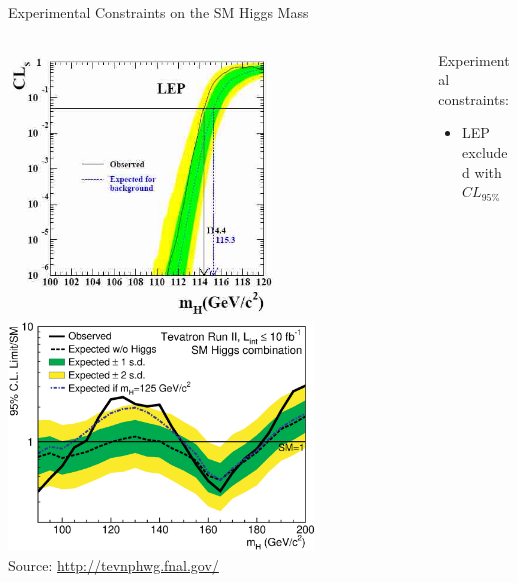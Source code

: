 \begin{frame}{Experimental Constraints on the SM Higgs Mass}
\begin{center}
\begin{columns}
      \begin{column}{0.5\textwidth}
        \begin{center}
\includegraphics[width=0.65\textwidth]{images/lep2limit.jpg}\\
\includegraphics[width=0.75\textwidth]{images/tevsmlimits_feb2013.eps}\\
{\fontsize{.1cm}{.001em}\selectfont Source: \url{http://tevnphwg.fnal.gov/}}
\end{center}
\end{column}
\begin{column}{0.5\textwidth}
Experimental constraints:
\begin{itemize}
\item
  LEP excluded with $CL_{95\%}$\\

\end{itemize}
\end{column}
\end{columns}
\end{center}
\end{frame}
